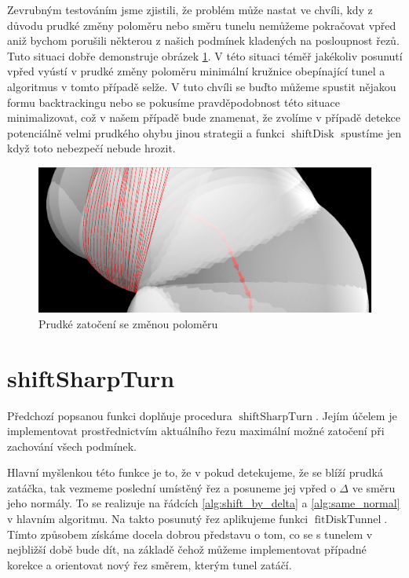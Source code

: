 Zevrubným testováním jsme zjistili, že problém může nastat ve chvíli, kdy
z důvodu prudké změny poloměru nebo směru tunelu nemůžeme pokračovat vpřed aniž
bychom porušili některou z našich podmínek kladených na posloupnost řezů.
Tuto situaci dobře demonstruje obrázek \ref{fig:sharp_curve}. V této situaci
téměř jakékoliv posunutí vpřed vyústí v prudké změny poloměru minimální kružnice
obepínající tunel a algoritmus v tomto případě selže. V tuto chvíli se buďto
můžeme spustit nějakou formu backtrackingu nebo se pokusíme pravděpodobnost
této situace minimalizovat, což v našem případě bude znamenat, že zvolíme v případě
detekce potenciálně velmi prudkého ohybu jinou strategii a funkci
$ \operatorname{shiftDisk} $ spustíme jen když toto nebezpečí nebude hrozit.

\begin{figure}[ht]
    \centering
    \includegraphics[width=\textwidth]{img/sharp_curve.png}
    \caption{Prudké zatočení se změnou poloměru}
  \centering
  \label{fig:sharp_curve}
\end{figure}





\section{shiftSharpTurn} \label{subsec:shift_sharp_turn}
Předchozí popsanou funkci doplňuje procedura $ \operatorname{shiftSharpTurn} $.
Jejím účelem je implementovat prostřednictvím aktuálního řezu maximální možné
zatočení při zachování všech podmínek.

Hlavní myšlenkou této funkce je to, že v pokud detekujeme, že se blíží prudká
zatáčka, tak vezmeme poslední umístěný řez a posuneme jej vpřed o $ \Delta $ ve směru
jeho normály. To se realizuje na řádcích \ref{alg:shift_by_delta} a
\ref{alg:same_normal} v hlavním algoritmu. Na takto posunutý řez aplikujeme
funkci $ \operatorname{fitDiskTunnel} $. Tímto způsobem získáme docela dobrou
představu o tom, co se s tunelem v nejbližší době bude dít, na základě čehož
můžeme implementovat případné korekce a orientovat nový řez směrem, kterým
tunel zatáčí.

